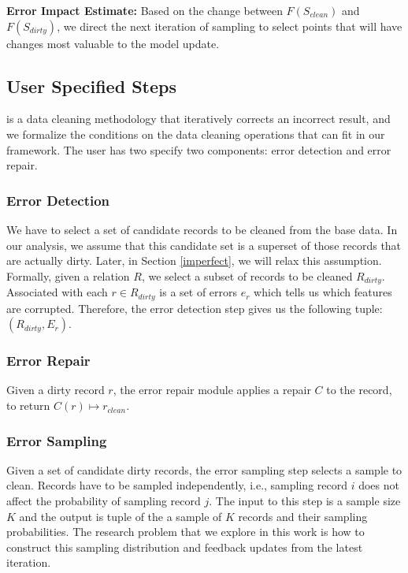 \vspace{0.5em}

\noindent\textbf{Error Impact Estimate: } Based on the change between $F(S_{clean})$ and $F(S_{dirty})$, we direct the next iteration of sampling to select points that will have changes most valuable to the model update.

\subsection{User Specified Steps}
\sys is a data cleaning methodology that iteratively corrects an incorrect result, and we formalize the conditions on the data cleaning operations that can fit in our framework.
The user has two specify two components: error detection and error repair.

\subsubsection{Error Detection}
We have to select a set of candidate records to be cleaned from the base data.
In our analysis, we assume that this candidate set is a superset of those records that are actually dirty.
Later, in Section \ref{imperfect}, we will relax this assumption.
Formally, given a relation $R$, we select a subset of records to be cleaned $R_{dirty}$.
Associated with each $r \in R_{dirty}$ is a set of errors $e_r$ which tells us which features are corrupted.
Therefore, the error detection step gives us the following tuple: $(R_{dirty},E_r)$.

\subsubsection{Error Repair}
Given a dirty record $r$, the error repair module applies a repair $C$ to the record, to return $C(r)\mapsto r_{clean}$. 

\iffalse


\subsubsection{Error Sampling}
Given a set of candidate dirty records, the error sampling step selects a sample to clean.
Records have to be sampled independently, i.e., sampling record $i$ does not affect the probability of sampling record $j$.
The input to this step is a sample size $K$ and the output is tuple of the a sample of $K$ records and their sampling probabilities.
The research problem that we explore in this work is how to construct this sampling distribution and feedback updates from the latest iteration.

